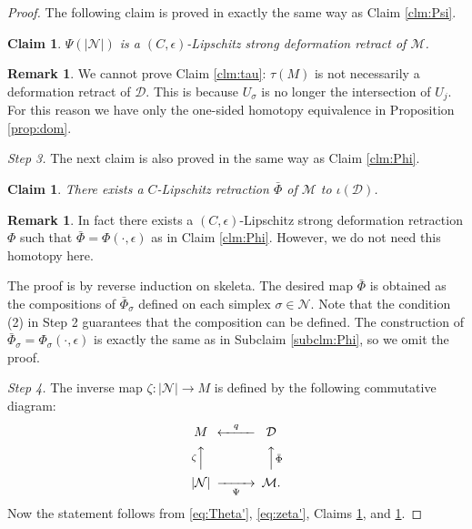 \documentclass[a4paper,12pt]{amsart}
\theoremstyle{plain}
\newtheorem{clm}[thm]{Claim}
\theoremstyle{definition}
\newtheorem{rem}[thm]{Remark}
\numberwithin{thm}{section}
\numberwithin{equation}{section}
\newcommand{\step}[1]{\medskip\noindent\textit{#1.}}
\begin{document}
\begin{proof}
The following claim is proved in exactly the same way as Claim \ref{clm:Psi}.

\begin{clm}\label{clm:Psi'}
$\Psi(|\mathcal N|)$ is a $(C,\epsilon)$-Lipschitz strong deformation retract of $\mathcal M$.
\end{clm}

\begin{rem}\label{rem:tau'}
We cannot prove Claim \ref{clm:tau}: $\tau(M)$ is not necessarily a deformation retract of $\mathcal D$.
This is because $U_\sigma$ is no longer the intersection of $U_j$.
For this reason we have only the one-sided homotopy equivalence in Proposition \ref{prop:dom}.
\end{rem}

\step{Step 3}
The next claim is also proved in the same way as Claim \ref{clm:Phi}.

\begin{clm}\label{clm:Phi'}
There exists a $C$-Lipschitz retraction $\bar\Phi$ of $\mathcal M$ to $\iota(\mathcal D)$.
\end{clm}

\begin{rem}
In fact there exists a $(C,\epsilon)$-Lipschitz strong deformation retraction $\Phi$ such that $\bar\Phi=\Phi(\cdot,\epsilon)$ as in Claim \ref{clm:Phi}.
However, we do not need this homotopy here.
\end{rem}

The proof is by reverse induction on skeleta.
The desired map $\bar\Phi$ is obtained as the compositions of $\bar\Phi_\sigma$ defined on each simplex $\sigma\in\mathcal N$.
Note that the condition (2) in Step 2 guarantees that the composition can be defined.
The construction of $\bar\Phi_\sigma=\Phi_\sigma(\cdot,\epsilon)$ is exactly the same as in Subclaim \ref{subclm:Phi}, so we omit the proof.

\step{Step 4}
The inverse map $\zeta:|\mathcal N|\to M$ is defined by the following commutative diagram:
\begin{equation}\label{eq:zeta'}
\begin{CD}
M @<q << \mathcal D \\
@A\zeta AA @AA\bar\Phi A \\
|\mathcal N| @>>\Psi> \mathcal M.
\end{CD}
\end{equation}
Now the statement follows from \eqref{eq:Theta'}, \eqref{eq:zeta'}, Claims \ref{clm:Psi'}, and \ref{clm:Phi'}.
\end{proof}
\end{document}

